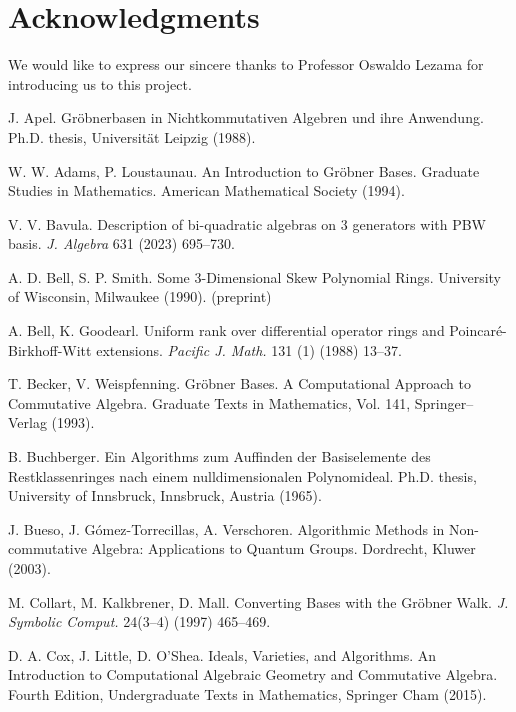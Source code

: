 \documentclass{amsart}
\theoremstyle{definition}
\theoremstyle{remark}
\numberwithin{equation}{section}
\begin{document}
\section{Acknowledgments}

We would like to express our sincere thanks to Professor Oswaldo Lezama for introducing us to this project.


\begin{thebibliography}{}

 J. Apel. Gr\"obnerbasen in Nichtkommutativen Algebren und ihre Anwendung. Ph.D. thesis, Universit\"at Leipzig (1988).

 W. W. Adams, P. Loustaunau. An {I}ntroduction to {G}r\"obner {B}ases. Graduate Studies in Mathematics. American Mathematical Society (1994).

 V. V. Bavula. Description of bi-quadratic algebras on 3 generators with PBW basis. {\em J. Algebra} 631 (2023) 695--730.

 A. D. Bell, S. P. Smith. Some 3-Dimensional Skew Polynomial Rings. University of Wisconsin, Milwaukee (1990). (preprint)

 A. Bell, K. Goodearl. Uniform rank over differential operator rings and {P}oincar\'e-{B}irkhoff-{W}itt extensions. {\em Pacific J. Math.} 131 (1) (1988) 13--37.

 T. Becker, V. Weispfenning. Gr\"obner Bases. A Computational Approach to Commutative Algebra. Graduate Texts in Mathematics, Vol. 141, Springer--Verlag (1993).


 B. Buchberger. Ein Algorithms zum Auffinden der Basiselemente des Restklassenringes nach einem nulldimensionalen Polynomideal. Ph.D. thesis, University of Innsbruck, Innsbruck, Austria (1965).

 J. Bueso, J. G\'omez-Torrecillas, A. Verschoren. Algorithmic {M}ethods in {N}on-commutative {A}lgebra: {A}pplications to {Q}uantum {G}roups. Dordrecht, Kluwer (2003).

 M. Collart, M. Kalkbrener, D. Mall. Converting {B}ases with the {G}r\"obner {W}alk. {\em J. Symbolic Comput.} 24(3--4) (1997) 465--469.

 D. A. Cox, J. Little, D. O'Shea. Ideals, {V}arieties, and {A}lgorithms. {A}n {I}ntroduction to {C}omputational {A}lgebraic {G}eometry and {C}ommutative {A}lgebra. {F}ourth {E}dition, Undergraduate Texts in Mathematics, Springer Cham (2015).


\end{thebibliography}
\end{document}
